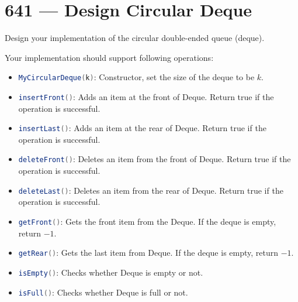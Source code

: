 \section{641 --- Design Circular Deque}
Design your implementation of the circular double-ended queue (deque).

Your implementation should support following operations:

\begin{itemize}
\item \lstinline[language=Java, basicstyle=\small\ttfamily, keywordstyle=\bfseries\color{green!40!black}]|MyCircularDeque(k)|: Constructor, set the size of the deque to be $k$.
\item \lstinline[language=Java, basicstyle=\small\ttfamily, keywordstyle=\bfseries\color{green!40!black}]|insertFront()|: Adds an item at the front of Deque. Return true if the operation is successful.
\item \lstinline[language=Java, basicstyle=\small\ttfamily, keywordstyle=\bfseries\color{green!40!black}]|insertLast()|: Adds an item at the rear of Deque. Return true if the operation is successful.
\item \lstinline[language=Java, basicstyle=\small\ttfamily, keywordstyle=\bfseries\color{green!40!black}]|deleteFront()|: Deletes an item from the front of Deque. Return true if the operation is successful.
\item \lstinline[language=Java, basicstyle=\small\ttfamily, keywordstyle=\bfseries\color{green!40!black}]|deleteLast()|: Deletes an item from the rear of Deque. Return true if the operation is successful.
\item \lstinline[language=Java, basicstyle=\small\ttfamily, keywordstyle=\bfseries\color{green!40!black}]|getFront()|: Gets the front item from the Deque. If the deque is empty, return $-1$.
\item \lstinline[language=Java, basicstyle=\small\ttfamily, keywordstyle=\bfseries\color{green!40!black}]|getRear()|: Gets the last item from Deque. If the deque is empty, return $-1$.
\item \lstinline[language=Java, basicstyle=\small\ttfamily, keywordstyle=\bfseries\color{green!40!black}]|isEmpty()|: Checks whether Deque is empty or not. 
\item \lstinline[language=Java, basicstyle=\small\ttfamily, keywordstyle=\bfseries\color{green!40!black}]|isFull()|: Checks whether Deque is full or not.
\end{itemize} 

